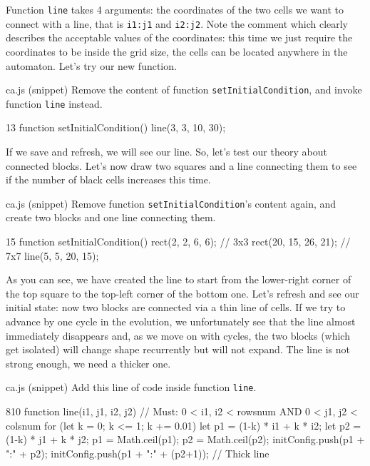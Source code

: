 Function \texttt{line} takes 4 arguments: the coordinates of the two cells we want to connect
with a line, that is \texttt{i1:j1} and \texttt{i2:j2}. Note the comment which clearly
describes the acceptable values of the coordinates: this time we just require the coordinates
to be inside the grid size, the cells can be located anywhere in the automaton. Let's try our
new function.

\begin{programcode}{ca.js (snippet)}
Remove the content of function \texttt{setInitialCondition}, and invoke function \texttt{line}
instead.
\begin{codeh1}{1}{3}
function setInitialCondition() {
  line(3, 3, 10, 30);
}
\end{codeh1}
\end{programcode}

If we save and refresh, we will see our line.
So, let's test our theory about connected blocks. Let's now draw two squares and a line connecting
them to see if the number of black cells increases this time.

\begin{programcode}{ca.js (snippet)}
Remove function \texttt{setInitialCondition}'s content again, and create two blocks and one
line connecting them.
\begin{codeh1}{1}{5}
function setInitialCondition() {
  rect(2, 2, 6, 6); // 3x3
  rect(20, 15, 26, 21); // 7x7
  line(5, 5, 20, 15);
}
\end{codeh1}
\end{programcode}

As you can see, we have created the line to start from the lower-right corner of the top square to
the top-left corner of the bottom one. Let's refresh and see our initial state: now two blocks
are connected via a thin line of cells. If we try to advance by one cycle in the evolution, we
unfortunately see that the line almost immediately disappears and, as we move on with cycles,
the two blocks (which get isolated) will change shape recurrently but will not expand. The line
is not strong enough, we need a thicker one.

\begin{programcode}{ca.js (snippet)}
Add this line of code inside function \texttt{line}.
\begin{codeh1}{8}{10}
function line(i1, j1, i2, j2) {
  // Must: 0 < i1, i2 < rowsnum AND 0 < j1, j2 < colsnum
  for (let k = 0; k <= 1; k += 0.01) {
    let p1 = (1-k) * i1 + k * i2;
    let p2 = (1-k) * j1 + k * j2;
    p1 = Math.ceil(p1);
    p2 = Math.ceil(p2);
    initConfig.push(p1 + ":" + p2);
    initConfig.push(p1 + ":" + (p2+1)); // Thick line
  }
}
\end{codeh1}
\end{programcode}

